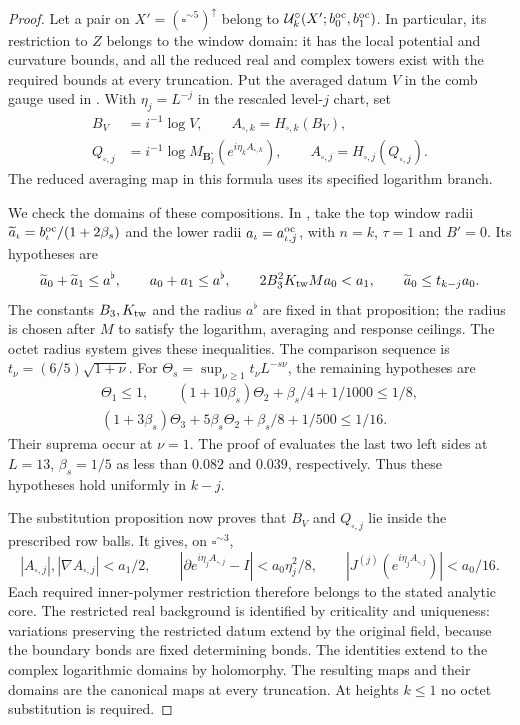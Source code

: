 \documentclass[11pt,letterpaper,reqno]{amsart}
\theoremstyle{definition}
\theoremstyle{remark}
\begin{document}
\begin{proof}
Let a pair on $X'=(\square^{\sim5})^\uparrow$ belong to
$\mathcal U_k^\circ(X';b_0^{\rm oc},b_1^{\rm oc})$.
In particular, its restriction to $Z$ belongs to the
window domain: it has the local potential and curvature
bounds, and all the reduced real and complex towers
exist with the required bounds at every truncation.
Put the averaged datum $V$ in the comb gauge used in
\cite[Prop.~4.47]{YMM1}. With $\eta_j=L^{-j}$ in the
rescaled level-$j$ chart, set
\[
 \begin{split}
  B_V&=i^{-1}\log V,\qquad
  A_{\square,k}=H_{\square,k}(B_V),\\
  Q_{\square,j}&=i^{-1}\log M_{\mathbf B_j^\square}
                          (e^{i\eta_kA_{\square,k}}),\qquad
  A_{\square,j}=H_{\square,j}(Q_{\square,j}).
 \end{split}
\]
The reduced averaging map in this formula uses its
specified logarithm branch.

We check the domains of these compositions. In
\cite[Prop.~4.47]{YMM1}, take the top window radii
$\widetilde a_\iota=b_\iota^{\rm oc}/(1+2\beta_s)$ and
the lower radii $a_\iota=a_{\iota,j}^{\rm oc}$, with
$n=k$, $\tau=1$ and $B'=0$. Its hypotheses are
\[
 \widetilde a_0+\widetilde a_1\le a^\flat,\qquad
 a_0+a_1\le a^\flat,\qquad
 2B_3^2K_{\rm tw}Ma_0<a_1,\qquad
 \widetilde a_0\le t_{k-j}a_0.
\]
The constants $B_3,K_{\rm tw}$ and the radius $a^\flat$
are fixed in that proposition; the radius is chosen
after $M$ to satisfy the logarithm, averaging and
response ceilings. The octet radius system gives
these inequalities. The comparison sequence is
$t_\nu=(6/5)\sqrt{1+\nu}$. For
$\Theta_s=\sup_{\nu\ge1}t_\nu L^{-s\nu}$, the
remaining hypotheses are
\[
 \begin{gathered}
 \Theta_1\le1,\qquad
 (1+10\beta_s)\Theta_2+\beta_s/4+1/1000\le1/8,\\
 (1+3\beta_s)\Theta_3+5\beta_s\Theta_2
                    +\beta_s/8+1/500\le1/16.
 \end{gathered}
\]
Their suprema occur at $\nu=1$. The proof of
\cite[Prop.~4.50]{YMM1} evaluates the last two left
sides at $L=13$, $\beta_s=1/5$ as less than $0.082$
and $0.039$, respectively. Thus these hypotheses
hold uniformly in $k-j$.

The substitution proposition now proves that $B_V$
and $Q_{\square,j}$ lie inside the prescribed row
balls. It gives, on $\square^{\sim3}$,
\[
 |A_{\square,j}|,|\nabla A_{\square,j}|<a_1/2,
 \qquad |\partial e^{i\eta_jA_{\square,j}}-I|
                                      <a_0\eta_j^2/8,
 \qquad |J^{(j)}(e^{i\eta_jA_{\square,j}})|<a_0/16.
\]
Each required inner-polymer restriction therefore
belongs to the stated analytic core. The restricted
real background is identified by criticality and
uniqueness: variations preserving the restricted
datum extend by the original field, because the
boundary bonds are fixed determining bonds.
The identities extend to the complex logarithmic
domains by holomorphy. The resulting maps and their
domains are the canonical maps at every truncation.
At heights $k\le1$ no octet substitution is required.


\end{proof}
\end{document}
